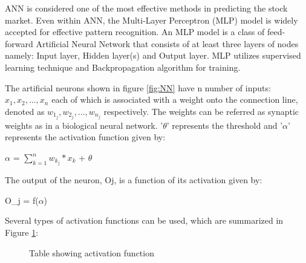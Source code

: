 ANN is considered one of the most effective methods in predicting the stock market. Even within ANN, the Multi-Layer Perceptron (MLP) model is widely accepted for effective pattern recognition. \cite{mp} An MLP model is a class of feed-forward Artificial Neural Network that consists of at least three layers of nodes namely: Input layer, Hidden layer(s) and Output layer. MLP utilizes supervised learning technique and Backpropagation algorithm for training.

The artificial neurons shown in figure \ref{fig:NN} have n number of inputs: $x_1, x_2,...,x_n$ each of which is associated with a weight onto the connection line, denoted as $w_1_j, w_2_j,...,w_n_j$ respectively. The weights can be referred as synaptic weights as in a biological neural network. '$\theta$'  represents the threshold and '$\alpha$' represents the activation function given by:

$\alpha$ = $\sum_{k = 1}^{n}  w_k_j * x_k$ + $\theta$

The output of the neuron, Oj, is a function of its activation given by:

O_j = f($\alpha$)

Several types of activation functions can be used, which are summarized in Figure \ref{fig:NNtable}:
\begin{figure}[h!]\centering
	\caption{Table showing activation function}
	\label{fig:NNtable}
\end{figure}

